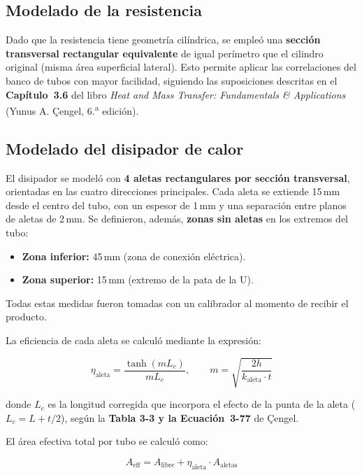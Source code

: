\documentclass[12pt, a4paper]{article}
\begin{document}
\subsection{Modelado de la resistencia}

Dado que la resistencia tiene geometría cilíndrica, se empleó una \textbf{sección transversal
rectangular equivalente} de igual perímetro que el cilindro original (misma área superficial
lateral). Esto permite aplicar las correlaciones del banco de tubos con mayor facilidad,
siguiendo las suposiciones descritas en el \textbf{Capítulo~3.6} del libro \textit{Heat and
Mass Transfer: Fundamentals \& Applications} (Yunus A. Çengel, 6.\textsuperscript{a} edición).

\subsection{Modelado del disipador de calor}

El disipador se modeló con \textbf{4 aletas rectangulares por sección transversal}, orientadas
en las cuatro direcciones principales. Cada aleta se extiende 15\,mm desde el centro del tubo,
con un espesor de 1\,mm y una separación entre planos de aletas de 2\,mm. Se definieron,
además, \textbf{zonas sin aletas} en los extremos del tubo:

\begin{itemize}
    \item \textbf{Zona inferior:} 45\,mm (zona de conexión eléctrica).
    \item \textbf{Zona superior:} 15\,mm (extremo de la pata de la U).
\end{itemize}

Todas estas medidas fueron tomadas con un calibrador al momento de recibir el producto.

La eficiencia de cada aleta se calculó mediante la expresión:

\begin{equation}
    \eta_{\text{aleta}} = \frac{\tanh(m L_c)}{m L_c},
    \qquad
    m = \sqrt{\frac{2h}{k_{\text{aleta}} \cdot t}}
    \label{eq:eta_aleta}
\end{equation}

donde $L_c$ es la longitud corregida que incorpora el efecto de la punta de la aleta
($L_c = L + t/2$), según la \textbf{Tabla 3-3 y la Ecuación~3-77} de Çengel.

El área efectiva total por tubo se calculó como:

\begin{equation}
    A_{\text{eff}} = A_{\text{libre}} + \eta_{\text{aleta}} \cdot A_{\text{aletas}}
    \label{eq:A_eff}
\end{equation}
\end{document}
